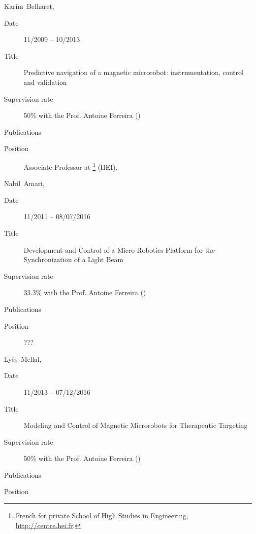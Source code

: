 \begin{enumerate}[leftmargin=3em,format={\sffamily\bfseries\smaller\color{blue2}},label={[SUP\arabic*]}]
  \LoadOrder
  \item{}\textsf{Karim~Belharet}, 
  \begin{description}
    \item[Date] 11/2009 -- 10/2013
    \item[Title] Predictive navigation of a magnetic microrobot:    instrumentation, control and validation
    \item[Supervision rate] 50\% with the Prof. Antoine Ferreira (\INSA \CVL)
    \item[Publications] \cite{2010_biorob_belharet,2010_iros_belharet,2010_mitat_belharet,2011_advrob_belharet,2012_book_belharet,2012_iros_belhharet,2012_isot_belharet,2013_isot_belharet,2013_tbme_folio,2014_icra_belharet,2014_iros_belharet}
    \item[Position] Associate Professor at \footnote{French for private School of High Studies in Engineering, \url{http://centre.hei.fr}.} (HEI).
  \end{description}
  
  \medskip
  \item{}\textsf{Nabil~Amari}, 
  \begin{description}
    \item[Date] 11/2011 -- 08/07/2016
    \item[Title] Development  and Control of a Micro-Robotics Platform for the Synchronization of  a Light Beam
    \item[Supervision rate] 33.3\% with the Prof. Antoine Ferreira (\INSA \CVL)
    \item[Publications] \cite{2013_iros_amari,2013_isot_amari,2014_acc_amari,2014_ijo_amari,2014_iros_amari,encyclo_2016_amari}
    \item[Position] ???
  \end{description}
  
  \medskip
  \item{}\textsf{Lyès~Mellal}, 
  \begin{description}
    \item[Date] 11/2013 -- 07/12/2016
    \item[Title] Modeling and Control of Magnetic Microrobots for Therapeutic  Targeting
    \item[Supervision rate] 50\% with the Prof. Antoine Ferreira (\INSA \CVL)
    \item[Publications] \cite{2015_jnr_lyes,2015_com_mellal,2015_iros_mellal,2016_icra_mellal,2016_com_mellal,2016_marss_mellal,2016_tnb_lyes,2017_marss_mellal}
    \item[Position] 
  \end{description}
  \SaveOrder
\end{enumerate}

